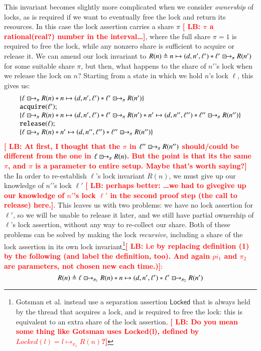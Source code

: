 \documentclass[runningheads]{llncs}
\newcommand{\LB}[1]{\textbf{\textcolor{red}{[ LB: #1]}}}
\newcommand{\islock}{\boxdotright}
\begin{document}
This invariant becomes slightly more complicated when we consider \emph{ownership} of locks, as is required if we want to eventually free the lock and return its resources. In this case the lock assertion carries a share $\pi$ \LB{$\pi$ a rational(real?) number in the interval\ldots}, where the full share $\pi = 1$ is required to free the lock, while any nonzero share is sufficient to acquire or release it. We can amend our lock invariant to $R(n) \triangleq n \mapsto (d, n', \ell') * \ell' \islock_\pi R(n')$ for some suitable share $\pi$, but then, what happens to the share of $n'$'s %
 lock when we release the lock on $n$? Starting from a state in which we hold $n$'s lock $\ell$, this gives us:
$$\begin{array}{l}
\{ \ell \islock_\pi R(n) * n \mapsto (d, n', \ell') * \ell' \islock_\pi R(n') \}\\
\texttt{acquire}(\ell');\\
\{ \ell \islock_\pi R(n) * n \mapsto (d, n', \ell') * \ell' \islock_\pi R(n') * n' \mapsto (d, n'', \ell'') * \ell'' \islock_\pi R(n'') \}\\
\texttt{release}(\ell);\\
\{ \ell \islock_\pi R(n) * n' \mapsto (d, n'', \ell'') * \ell'' \islock_\pi R(n'') \}
\end{array}$$
\LB{At first, I thought that the $\pi$ in $ \ell'' \islock_\pi R(n'')$ should/could be different from the one in $\ell \islock_\pi R(n)$. But the point is that its the same $\pi$, and $\pi$ is a parameter to entire setup. Maybe that's worth saying?}  the In order to re-establish $\ell$'s lock invariant $R(n)$, we must give up our knowledge of $n'$'s lock $\ell'$ \LB{perhaps better:  \ldots we had to givegive up our knowledge of $n'$'s lock $\ell'$ in the second proof step (the call to release) here.}. This leaves us with two problems: we have no lock assertion for $\ell'$, so we will be unable to release it later, and we still have partial ownership of $\ell$'s lock assertion, without any way to re-collect our share. Both of these problems can be solved by making the lock \emph{recursive}, including a share of the lock assertion in its own lock invariant\footnote{Gotsman et al. instead use a separation assertion $\mathsf{Locked}$ that is always held by the thread that acquires a lock, and is required to free the lock: this is equivalent to an extra share of the lock assertion. \LB{Do you mean some thing like Gotsman uses Locked(l), defined by $Locked(l) = l \mapsto_{\pi_1}R(n)$?}}\LB{i.e by replacing definition (1) by the following (and label the definition, too). And again $pi_1$ and $\pi_2$ are parameters, not chosen new each time.)}:
$$R(n) \triangleq \ell \islock_{\pi_1} R(n) * n \mapsto (d, n', \ell') * \ell' \islock_{\pi_2} R(n')$$
\end{document}
